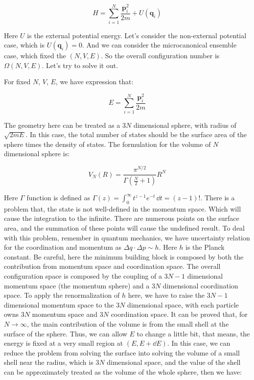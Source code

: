 \documentclass[../main.tex]{subfiles}
\begin{document}
\begin{equation}
    H = \sum_{i = 1}^{N} \frac{\bm{p}_i^2}{2m} + U(\bm{q}_i)
\end{equation}

Here $U$ is the external potential energy. Let's consider the non-external potential case, which is $U(\bm{q}_i) = 0$. And we can consider the microcanonical ensemble case, which fixed the $(N, V, E)$. So the overall configuration number is $\Omega(N, V, E)$. Let's try to solve it out. 

For fixed $N$, $V$, $E$, we have expression that:

\begin{equation}
    E = \sum_{i = 1}^{N} \frac{\bm{p}_i^2}{2m}
\end{equation}

The geometry here can be treated as a $3N$ dimensional sphere, with radius of $\sqrt{2mE}$. In this case, the total number of states should be the surface area of the sphere times the density of states. The formulation for the volume of $N$ dimensional sphere is:

\begin{equation}
    V_N(R) = \frac{\pi^{N/2}}{\Gamma\left(\frac{N}{2} + 1\right)} R^N
\end{equation}

Here $\Gamma$ function is defined as $\Gamma(z) = \int_0^\infty t^{z-1}e^{-t}\,\dd{t} = (z - 1)!$. There is a problem that, the state is not well-defined in the momentum space. Which will cause the integration to the infinite. There are numerous points on the surface area, and the summation of these points will cause the undefined result. To deal with this problem, remember in quantum mechanics, we have uncertainty relation for the coordination and momentum as $\Delta q \cdot \Delta p \sim h$. Here $h$ is the Planck constant. Be careful, here the minimum building block is composed by both the contribution from momentum space and coordination space. The overall configuration space is composed by the coupling of a $3N - 1$ dimensional momentum space (the momentum sphere) and a $3N$ dimensional coordination space. To apply the renormalization of $h$ here, we have to raise the $3N - 1$ dimensional momentum space to the $3N$ dimensional space, with each particle owns $3N$ momentum space and $3N$ coordination space. It can be proved that, for $N \to \infty$, the main contribution of the volume is from the small shell at the surface of the sphere. Thus, we can allow $E$ to change a little bit, that means, the energy is fixed at a very small region at $(E, E + \dd E)$. In this case, we can reduce the problem from solving the surface into solving the volume of a small shell near the radius, which is $3N$ dimensional space, and the value of the shell can be approximately treated as the volume of the whole sphere, then we have:
\end{document}
